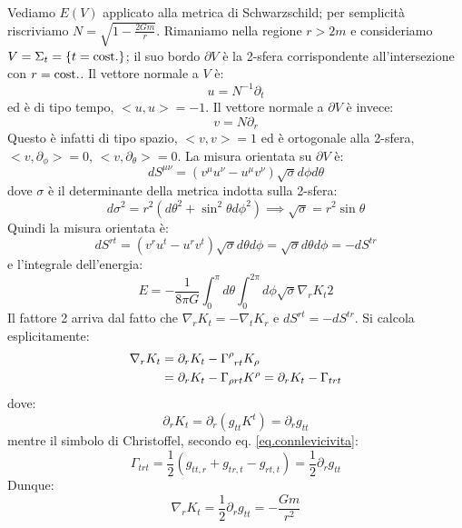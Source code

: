 Vediamo $E(V)$ applicato alla metrica di Schwarzschild; per semplicità riscriviamo $N=\sqrt{1 - \frac{2Gm}{r}}$. Rimaniamo nella regione $r> 2m$ e consideriamo $V = \Sigma_t = \{t=\textrm{cost.}\}$; il suo bordo $\partial V$ è la 2-sfera corrispondente all'intersezione con $r= \textrm{cost.}$.
Il vettore normale a $V$ è:
\begin{equation*}
    u= N^{-1}\partial_t
\end{equation*}
ed è di tipo tempo, $<u,u> = -1$. Il vettore normale a $\partial V$ è invece:
\begin{equation*}
    v = N\partial_r
\end{equation*}
Questo è infatti di tipo spazio, $<v,v> = 1$ ed è ortogonale alla 2-sfera, $<v,\partial_\phi> = 0$, $<v, \partial_\theta > = 0$.
La misura orientata su $\partial V$ è:
\begin{equation*}
    dS^{\mu\nu} = (v^\mu u^\nu - u^\mu v^\nu)\sqrt{\sigma}d\phi d\theta
\end{equation*}
dove $\sigma$ è il determinante della metrica indotta sulla 2-sfera:
\begin{equation*}
    d\sigma^2 = r^2(d\theta^2 + \sin^2\theta d\phi^2) \implies \sqrt{\sigma} = r^2\sin\theta
\end{equation*}
Quindi la misura orientata è:
\begin{equation*}
    dS^{rt} = (v^ru^t - u^r v^t)\sqrt{\sigma} d\theta d\phi = \sqrt{\sigma}d\theta d\phi = - dS^{tr}
\end{equation*}
e l'integrale dell'energia:
\begin{equation*}
    E = - \frac{1}{8\pi G}\int_0^\pi d\theta \int_0^{2\pi}d\phi \sqrt{\sigma}\nabla_r K_t 2
\end{equation*}
Il fattore 2 arriva dal fatto che $\nabla_r K_t = - \nabla_t K_r$ e $dS^{rt} = - dS^{tr}$. Si calcola esplicitamente:
\begin{align*}
    \nabla_r K_t &= \partial_r K_t - \tensor{\Gamma}{^\rho_{rt}}K_\rho \\
    &= \partial_r K_t - \Gamma_{\rho r t}K^\rho = \partial_r K_t - \Gamma_{trt}
\end{align*}
dove:
\begin{equation*}
    \partial_r K_t = \partial_r(g_{tt}K^t) = \partial_r g_{tt}
\end{equation*}
mentre il simbolo di Christoffel, secondo eq. \ref{eq.connlevicivita}:
\begin{equation*}
    \Gamma_{trt} = \frac{1}{2}(g_{tt,r} + g_{tr,t} - g_{rt,t}) = \frac{1}{2}\partial_r g_{tt}
\end{equation*}
Dunque:
\begin{equation*}
    \nabla_r K_t = \frac{1}{2}\partial_r g_{tt}= - \frac{Gm}{r^2}
\end{equation*}

